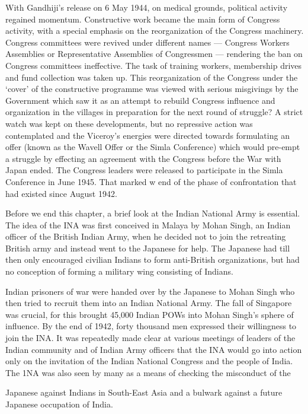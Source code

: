 With Gandhiji’s release on 6 May 1944, on medical grounds, political activity regained momentum. Constructive work became the main form of Congress activity, with a special emphasis on the reorganization of the Congress machinery. Congress committees were revived under different names — Congress Workers Assemblies or Representative Assemblies of Congressmen — rendering the ban on Congress committees ineffective. The task of training workers, membership drives and fund collection was taken up. This reorganization of the Congress under the ‘cover’ of the constructive programme was viewed with serious misgivings by the Government which saw it as an attempt to rebuild Congress influence and organization in the villages in preparation for the next round of struggle? A strict watch was kept on these developments, but no repressive action was contemplated and the Viceroy’s energies were directed towards formulating an offer (known as the Wavell Offer or the Simla Conference) which would pre-empt a struggle by effecting an agreement with the Congress before the War with Japan ended. The Congress leaders were released to participate in the Simla Conference in June 1945. That marked w end of the phase of confrontation that had existed since August 1942.

Before we end this chapter, a brief look at the Indian National Army is essential. The idea of the INA was first conceived in Malaya by Mohan Singh, an Indian officer of the British Indian Army, when he decided not to join the retreating British army and instead went to the Japanese for help. The Japanese had till then only encouraged civilian Indians to form anti-British organizations, but had no conception of forming a military wing consisting of Indians.

Indian prisoners of war were handed over by the Japanese to Mohan Singh who then tried to recruit them into an Indian National Army. The fall of Singapore was crucial, for this brought 45,000 Indian POWs into Mohan Singh’s sphere of influence. By the end of 1942, forty thousand men expressed their willingness to join the INA. It was repeatedly made clear at various meetings of leaders of the Indian community and of Indian Army officers that the INA would go into action only on the invitation of the Indian National Congress and the people of India. The 1NA was also seen by many as a means of checking the misconduct of the

Japanese against Indians in South-East Asia and a bulwark against a future Japanese occupation of India.

